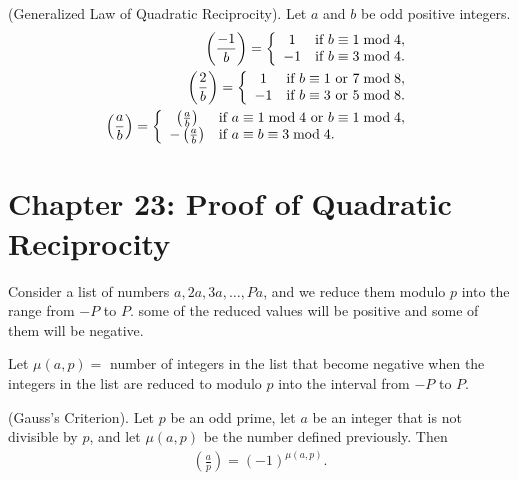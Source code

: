 \documentclass[graybox]{svmult}
\begin{document}
\begin{svgraybox}
\begin{theorem}
(Generalized Law of Quadratic Reciprocity). Let $a$ and $b$ be odd positive integers.
\begin{align*}
\left(\frac{-1}{b}\right) = \left\{
\begin{array}{c l}
    1 & \text{if } b \equiv 1 \bmod 4, \\
    -1 & \text{if } b \equiv 3 \bmod 4.
\end{array}\right. \\
\left(\frac{2}{b}\right) = \left\{
\begin{array}{c l}
    1 & \text{if } b \equiv 1 \text{ or } 7 \bmod 8, \\
    -1 & \text{if } b \equiv 3 \text{ or } 5 \bmod 8.
\end{array}\right. \\
\left(\frac{a}{b}\right) = \left\{
\begin{array}{c l}
    \left(\frac{a}{b}\right) & \text{if } a \equiv 1 \bmod 4 \text{ or } b \equiv 1 \bmod 4, \\
    -\left(\frac{a}{b}\right) & \text{if } a \equiv b \equiv 3 \bmod 4.
\end{array}\right.
\end{align*}
\end{theorem}
\end{svgraybox}

\section*{Chapter 23: Proof of Quadratic Reciprocity}

\begin{definition}
Consider a list of numbers $a, 2a, 3a, \ldots, Pa$, and we reduce them
modulo $p$ into the range from $-P$ to $P$. some of the reduced values will be positive
and some of them will be  negative.

Let $\mu(a, p) =$ number of integers in the list that become negative when the integers in the list are reduced to modulo $p$ into the interval from $-P$ to $P$.
\end{definition}

\begin{theorem}
(Gauss's Criterion). Let $p$ be an odd prime, let $a$ be an integer that is not divisible by $p$, and let $\mu(a,p)$ be the number defined previously. Then
\begin{align*}
\left(\frac{a}{p}\right) = (-1)^{\mu(a, p)}.
\end{align*}
\end{theorem}
\end{document}
